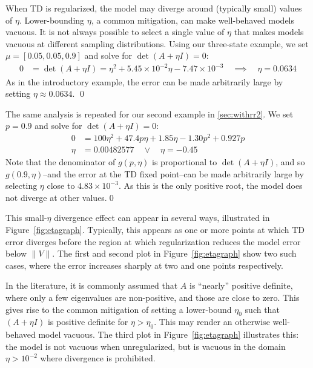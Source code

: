 \begin{example}\label{ex:badeta}
  When TD is regularized, the model may diverge around (typically small) values of $\eta$. Lower-bounding $\eta$, a common mitigation, can make well-behaved models vacuous. It is not always possible to select a single value of $\eta$ that makes models vacuous at different sampling distributions.
  \vspace{-1em}\proof
  Using our three-state example, we set $\mu=[0.05, 0.05, 0.9]$ and solve for $\det(A+\eta I)=0$:
  \begin{align}
    0 & = \det(A+\eta I) = \eta^2 + 5.45\times 10^{-2} \eta - 7.47\times 10^{-3}
    \quad\implies\quad  \eta = 0.0634
  \end{align}
  As in the introductory example, the error can be made arbitrarily large by setting $\eta\approx 0.0634$.
  \qed
\end{example}


The same analysis is repeated for our second example in \ref{sec:withrr2}. We set $p=0.9$ and solve for $\det(A+\eta I)=0$:
\proof
\begin{align}
  0 & = 100\eta^2+47.4p\eta +1.85\eta - 1.30p^2 + 0.927p
  \\  \eta & = 0.00482577 \quad \lor \quad \eta = -0.45
\end{align}
Note that the denominator of $g(p,\eta)$ is proportional to $\det(A+\eta I)$, and so $g(0.9,\eta)$--and the error at the TD fixed point--can be made arbitrarily large by selecting $\eta$ close to $4.83\times 10^{-3}$. As this is the only positive root, the model does not diverge at other values.\qed

This small-$\eta$ divergence effect can appear in several ways, illustrated in Figure~\ref{fig:etagraph}. Typically, this appears as one or more points at which TD error diverges before the region at which regularization reduces the model error below $\|V\|$. The first and second plot in Figure~\ref{fig:etagraph} show two such cases, where the error increases sharply at two and one points respectively.

In the literature, it is commonly assumed that $A$ is ``nearly'' positive definite, where only a few eigenvalues are non-positive, and those are close to zero. This gives rise to the common mitigation of setting a lower-bound $\eta_0$ such that $(A+\eta I)$ is positive definite for $\eta>\eta_0$. This may render an otherwise well-behaved model vacuous. The third plot in Figure~\ref{fig:etagraph} illustrates this: the model is not vacuous when unregularized, but is vacuous in the domain $\eta > 10^{-2}$ where divergence is prohibited.

